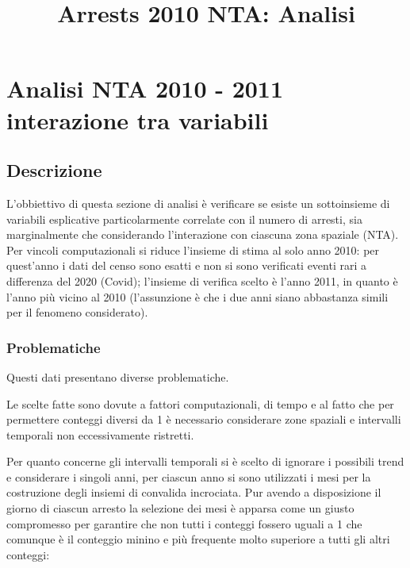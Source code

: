 \documentclass[
  ,
]{article}
\title{Arrests 2010 NTA: Analisi}
\author{}
\date{\vspace{-2.5em}}
\begin{document}
\maketitle

{
\setcounter{tocdepth}{2}
\tableofcontents
}
\hypertarget{analisi-nta-2010---2011-interazione-tra-variabili}{%
\section{Analisi NTA 2010 - 2011 interazione tra variabili}\label{analisi-nta-2010---2011-interazione-tra-variabili}}

\hypertarget{descrizione}{%
\subsection{Descrizione}\label{descrizione}}

L'obbiettivo di questa sezione di analisi è verificare se esiste un sottoinsieme di variabili esplicative particolarmente correlate con il numero di arresti, sia marginalmente che considerando l'interazione con ciascuna zona spaziale (NTA).
Per vincoli computazionali si riduce l'insieme di stima al solo anno 2010: per quest'anno i dati del censo sono esatti e non si sono verificati eventi rari a differenza del 2020 (Covid); l'insieme di verifica scelto è l'anno 2011, in quanto è l'anno più vicino al 2010 (l'assunzione è che i due anni siano abbastanza simili per il fenomeno considerato).

\hypertarget{problematiche}{%
\subsubsection{Problematiche}\label{problematiche}}

Questi dati presentano diverse problematiche.

Le scelte fatte sono dovute a fattori computazionali, di tempo e al fatto che per permettere conteggi diversi da 1 è necessario considerare zone spaziali e intervalli temporali non eccessivamente ristretti.

Per quanto concerne gli intervalli temporali si è scelto di ignorare i possibili trend e considerare i singoli anni, per ciascun anno si sono utilizzati i mesi per la costruzione degli insiemi di convalida incrociata. Pur avendo a disposizione il giorno di ciascun arresto la selezione dei mesi è apparsa come un giusto compromesso per garantire che non tutti i conteggi fossero uguali a 1 che comunque è il conteggio minino e più frequente molto superiore a tutti gli altri conteggi:
\end{document}
